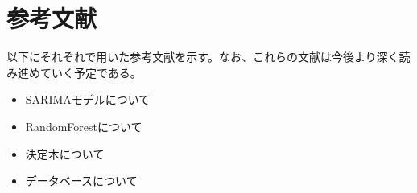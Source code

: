 \documentclass{scrartcl}
\begin{document}
\section{参考文献}
\label{sec:org2019d3f}
以下にそれぞれで用いた参考文献を示す。なお、これらの文献は今後より深く読み進めていく予定である。\\
\begin{itemize}
\item SARIMAモデルについて \cite{sarima01} \cite{sarima02} \cite{sarima03} \cite{sarima04} \cite{sarima05}\\
\item RandomForestについて \cite{rf01} \cite{rf02} \cite{rf03} \cite{rf04} \cite{rf05} \cite{rf06} \cite{rf07} \cite{Breiman:2001:RF:570181.570182} \cite{rf08} \cite{rf09}\\
\item 決定木について \cite{tree01}\\
\item データベースについて \cite{hbase01} \cite{hbase02} \cite{hbase03}\\
\end{itemize}

\printbibliography\\
\end{document}
